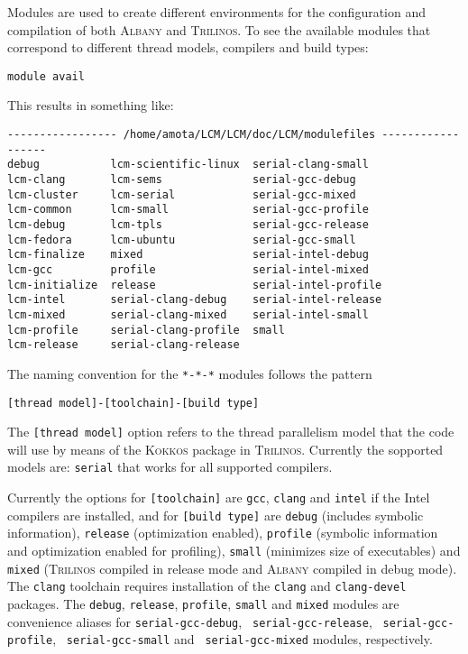\documentclass{article}
\newcommand{\trilinos}{\textsc{Trilinos}}
\newcommand{\albany}{\textsc{Albany}}
\newcommand{\kokkos}{\textsc{Kokkos}}
\begin{document}
Modules are used to create different environments for the
configuration and compilation of both \albany{} and \trilinos{}. To
see the available modules that correspond to different thread models,
compilers and build types:
\begin{verbatim}
module avail
\end{verbatim}
This results in something like:
\begin{verbatim}
----------------- /home/amota/LCM/LCM/doc/LCM/modulefiles ------------------
debug           lcm-scientific-linux  serial-clang-small    
lcm-clang       lcm-sems              serial-gcc-debug      
lcm-cluster     lcm-serial            serial-gcc-mixed      
lcm-common      lcm-small             serial-gcc-profile    
lcm-debug       lcm-tpls              serial-gcc-release    
lcm-fedora      lcm-ubuntu            serial-gcc-small      
lcm-finalize    mixed                 serial-intel-debug    
lcm-gcc         profile               serial-intel-mixed    
lcm-initialize  release               serial-intel-profile  
lcm-intel       serial-clang-debug    serial-intel-release  
lcm-mixed       serial-clang-mixed    serial-intel-small    
lcm-profile     serial-clang-profile  small                 
lcm-release     serial-clang-release  
\end{verbatim}
The naming convention for the \verb+*-*-*+ modules follows the pattern
\begin{verbatim}
[thread model]-[toolchain]-[build type]
\end{verbatim}
The \verb+[thread model]+ option refers to the thread parallelism model that the
code will use by means of the \kokkos{} package in \trilinos{}. Currently the
sopported models are: \verb+serial+ that works for all supported compilers.

Currently the options for \verb+[toolchain]+ are \verb+gcc+,
\verb+clang+ and \verb+intel+ if the Intel compilers are installed,
and for \verb+[build type]+ are \verb+debug+ (includes symbolic
information), \verb+release+ (optimization enabled), \verb+profile+
(symbolic information and optimization enabled for profiling),
\verb+small+ (minimizes size of executables) and \verb+mixed+
(\trilinos{} compiled in release mode and \albany{} compiled in debug
mode). The \verb+clang+ toolchain requires installation of the
\verb+clang+ and \verb+clang-devel+ packages. The \verb+debug+,
\verb+release+, \verb+profile+, \verb+small+ and \verb+mixed+ modules
are convenience aliases for \verb+serial-gcc-debug+,
\verb+ serial-gcc-release+, \verb+ serial-gcc-profile+,
\verb+ serial-gcc-small+ and \verb+ serial-gcc-mixed+ modules,
respectively.
\end{document}
